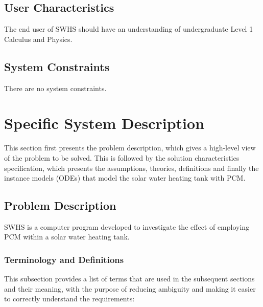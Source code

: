 \documentclass[12pt]{article}
\newcommand{\progname}{SWHS}
\begin{document}

\subsection{User Characteristics}

The end user of \progname{} should have an understanding of undergraduate Level
1 Calculus and Physics.

\subsection{System Constraints}

There are no system constraints.

\section{Specific System Description}

This section first presents the problem description, which gives a high-level
view of the problem to be solved.  This is followed by the solution characteristics
specification, which presents the assumptions, theories, definitions and finally
the instance models (ODEs) that model the solar water heating tank with PCM.

\subsection{Problem Description} \label{Sec_pd}

\progname{} is a computer program developed to investigate the effect of
employing PCM within a solar water heating tank.


\subsubsection{Terminology and  Definitions}

This subsection provides a list of terms that are used in the subsequent
sections and their meaning, with the purpose of reducing ambiguity and making it
easier to correctly understand the requirements:
\end{document}
